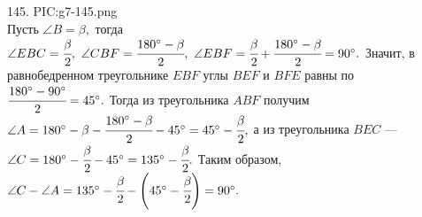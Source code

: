 145. {{PIC:g7-145.png}}\\
Пусть $\angle B=\beta,$ тогда $\angle EBC=\cfrac{\beta}{2},\ \angle CBF=\cfrac{180^\circ-\beta}{2},\ \angle EBF=\cfrac{\beta}{2}+\cfrac{180^\circ-\beta}{2}=90^\circ.$ Значит, в равнобедренном треугольнике $EBF$ углы $BEF$ и $BFE$ равны по $\cfrac{180^\circ-90^\circ}{2}=45^\circ.$ Тогда из треугольника $ABF$ получим $\angle A=180^\circ-\beta-\cfrac{180^\circ-\beta}{2}-45^\circ=45^\circ-\cfrac{\beta}{2},$ а из треугольника $BEC$ --- $\angle C=180^\circ-\cfrac{\beta}{2}-45^\circ=135^\circ-\cfrac{\beta}{2}.$ Таким образом, $\angle C-\angle A=135^\circ-\cfrac{\beta}{2} -\left(45^\circ-\cfrac{\beta}{2}\right)=90^\circ.$\newpage\noindent
